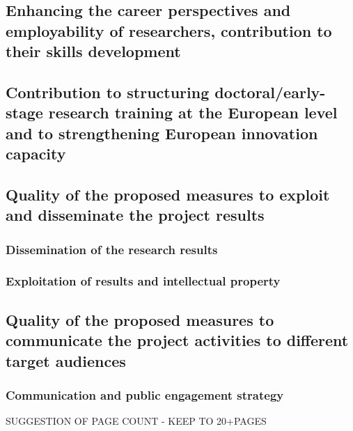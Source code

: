 \documentclass[11pt,a4paper]{article}
\begin{document}
{{{{%
\subsection{Enhancing the career perspectives and employability of researchers, contribution to their skills development} 

\processdelayedfloats
\subsection{Contribution to structuring doctoral/early-stage research training at the European level and to strengthening European innovation capacity}
\label{subsec:ContribToEcon}

\processdelayedfloats

\vspace{-2mm}
\subsection{Quality of the proposed measures to exploit and disseminate the project results}
\label{sec:qualityExploitDissemination}

\subsubsection{Dissemination of the research results}
\label{sec:dissemination}


\subsubsection{Exploitation of results and intellectual property}
\label{sec:exploit}


\vspace{-2mm}
\subsection{Quality of the proposed measures to communicate the project activities to different target audiences}
\subsubsection{Communication and public engagement strategy}
\label{sec:CommPub}




\processdelayedfloats
%
{\scriptsize \noindent \color{red} SUGGESTION OF PAGE COUNT - KEEP TO 20+\numberofextrapages PAGES \\

}}}}}
\end{document}
